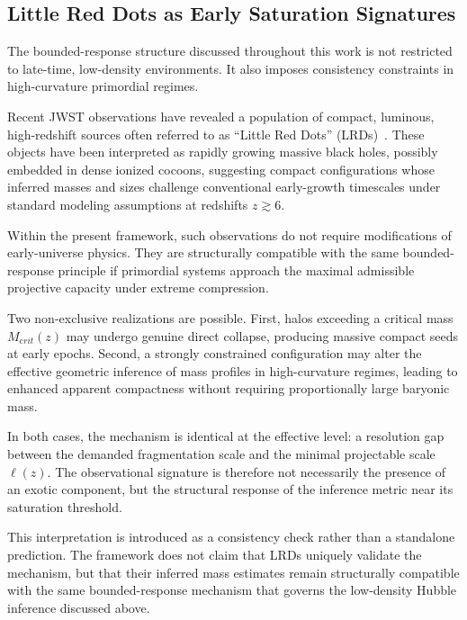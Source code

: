 \subsection{Little Red Dots as Early Saturation Signatures}
  \label{subsec:lrd_saturation}

  The bounded-response structure discussed throughout this work is not
  restricted to late-time, low-density environments.
  It also imposes consistency constraints in high-curvature primordial regimes.

  Recent JWST observations have revealed a population of compact,
  luminous, high-redshift sources often referred to as ``Little Red Dots''
  (LRDs)~\cite{Pacucci2025,Rusakov2026}.
  These objects have been interpreted as rapidly growing massive black holes,
  possibly embedded in dense ionized cocoons, suggesting compact configurations whose inferred masses and sizes
  challenge conventional early-growth timescales under standard
  modeling assumptions at redshifts $z \gtrsim 6$.

  Within the present framework, such observations do not require
  modifications of early-universe physics.
  They are structurally compatible with the same bounded-response principle
  if primordial systems approach the maximal admissible projective capacity
  under extreme compression.

  Two non-exclusive realizations are possible.
  First, halos exceeding a critical mass $M_{\mathrm crit}(z)$ may undergo
  genuine direct collapse, producing massive compact seeds at early epochs.
  Second, a strongly constrained configuration may alter the effective
  geometric inference of mass profiles in high-curvature regimes,
  leading to enhanced apparent compactness without requiring
  proportionally large baryonic mass.

  In both cases, the mechanism is identical at the effective level:
  a resolution gap between the demanded fragmentation scale and the
  minimal projectable scale~$\ell(z)$.
  The observational signature is therefore not necessarily the presence
  of an exotic component, but the structural response of the inference
  metric near its saturation threshold.

  This interpretation is introduced as a consistency check rather than
  a standalone prediction.
  The framework does not claim that LRDs uniquely validate the mechanism,
  but that their inferred mass estimates remain structurally compatible
  with the same bounded-response mechanism that governs the low-density
  Hubble inference discussed above.


